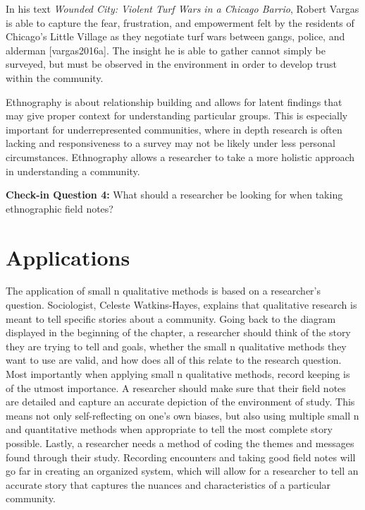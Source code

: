 \documentclass{book}
\newenvironment{shaded*}{
    \begin{center}
    \begin{tabular}{|p{0.9\textwidth}|}
    \hline\\
    }
    { 
    \\\\\hline
    \end{tabular} 
    \end{center}
}
\begin{document}
In his text \emph{Wounded City: Violent Turf Wars in a Chicago Barrio}, Robert
Vargas is able to capture the fear, frustration, and empowerment felt by the
residents of Chicago's Little Village as they negotiate turf wars between
gangs, police, and alderman {[}vargas2016a{]}. The insight he is able to
gather cannot simply be surveyed, but must be observed in the environment in
order to develop trust within the community.

Ethnography is about relationship building and allows for latent findings that
may give proper context for understanding particular groups. This is
especially important for underrepresented communities, where in depth research
is often lacking and responsiveness to a survey may not be likely under less
personal circumstances. Ethnography allows a researcher to take a more
holistic approach in understanding a community.

\begin{shaded*}

\textbf{Check-in Question 4:} What should a researcher be looking for when
taking ethnographic field notes?

\end{shaded*}

\hypertarget{applications-3}{%
\section{Applications}\label{applications-3}}

The application of small n qualitative methods is based on a researcher's
question. Sociologist, Celeste Watkins-Hayes, explains that qualitative
research is meant to tell specific stories about a community. Going back to
the diagram displayed in the beginning of the chapter, a researcher should
think of the story they are trying to tell and goals, whether the small n
qualitative methods they want to use are valid, and how does all of this
relate to the research question. Most importantly when applying small n
qualitative methods, record keeping is of the utmost importance. A researcher
should make sure that their field notes are detailed and capture an accurate
depiction of the environment of study. This means not only self-reflecting on
one's own biases, but also using multiple small n and quantitative methods
when appropriate to tell the most complete story possible. Lastly, a
researcher needs a method of coding the themes and messages found through
their study. Recording encounters and taking good field notes will go far in
creating an organized system, which will allow for a researcher to tell an
accurate story that captures the nuances and characteristics of a particular
community.
\end{document}
